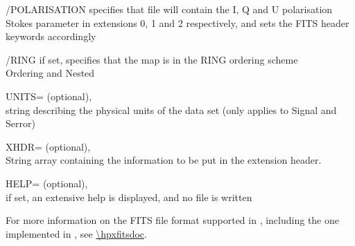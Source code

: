 \begin{keywords}
\begin{kwlist}{}
	\item[{/POLARISATION}] 
	  specifies that file will contain the I, Q and U polarisation
           Stokes parameter in extensions 0, 1 and 2 respectively, and sets the
FITS header keywords accordingly

	\item[{/RING}]   if set, specifies that the map is in the RING ordering
	scheme\\
	\seealso Ordering and Nested

	\item[{UNITS=}] 
		(optional), \\
		string describing the physical units of the data set (only applies
		to Signal and Serror)

    	\item[XHDR=] %
		(optional), \\
		String array containing the information to be put in
		the extension header. 

    	\item[HELP=] %
		(optional), \\
		if set, an extensive help is displayed, and no file is written

   \end{kwlist}
\end{keywords}

\begin{codedescription}
{For more information on the FITS file format supported in \healpixns, 
including the one implemented in \facname,
see \url{\hpxfitsdoc}.}

\end{codedescription}



